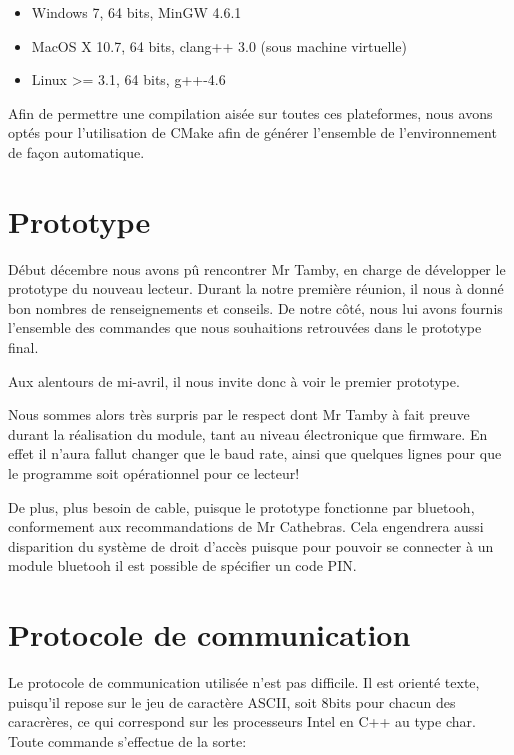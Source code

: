     \begin{itemize}
        \item Windows 7, 64 bits, MinGW 4.6.1
        \item MacOS X 10.7, 64 bits, clang++ 3.0 (sous machine virtuelle)
        \item Linux >= 3.1, 64 bits, g++-4.6
    \end{itemize}

    Afin de permettre une compilation aisée sur toutes ces plateformes, nous avons
optés pour l'utilisation de CMake afin de générer l'ensemble de l'environnement de
façon automatique.



\section{Prototype}
    Début décembre nous avons pû rencontrer Mr Tamby, en charge de développer le
prototype du nouveau lecteur. Durant la notre première réunion, il nous à donné
bon nombres de renseignements et conseils. De notre côté, nous lui avons fournis
l'ensemble des commandes que nous souhaitions retrouvées dans le prototype final.

    Aux alentours de mi-avril, il nous invite donc à voir le premier prototype.


    Nous sommes alors très surpris par le respect dont Mr Tamby à fait preuve
durant la réalisation du module, tant au niveau électronique que firmware.
En effet il n'aura fallut changer que le baud rate, ainsi que quelques lignes
pour que le programme soit opérationnel pour ce lecteur!

    De plus, plus besoin de cable, puisque le prototype fonctionne par bluetooh,
conformement aux recommandations de Mr Cathebras. Cela engendrera aussi disparition
du système de droit d'accès puisque pour pouvoir se connecter à un module bluetooh
il est possible de spécifier un code PIN.



\section{Protocole de communication}
    Le protocole de communication utilisée n'est pas difficile. Il est orienté 
texte, puisqu'il repose sur le jeu de caractère ASCII, soit 8bits pour chacun des
caracrères, ce qui correspond sur les processeurs Intel en C++ au type char. 
Toute commande s'effectue de la sorte:

